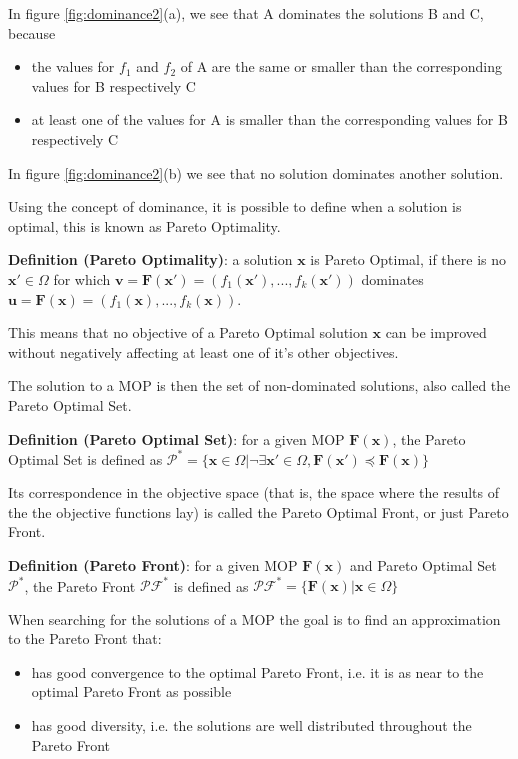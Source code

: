In figure \ref{fig:dominance2}(a), we see that A dominates the solutions B and C, because
\begin{itemize}
  \item the values for $f_1$ and $f_2$ of A are the same or smaller than the corresponding values for B respectively C
  \item at least one of the values for A is smaller than the corresponding values for B respectively C
\end{itemize}
In figure \ref{fig:dominance2}(b) we see that no solution dominates another solution.

Using the concept of dominance, it is possible to define when a solution is optimal, this is known as Pareto Optimality.

\noindent\textbf{Definition (Pareto Optimality)}: a solution $\mathbf{x}$ is Pareto Optimal, if there is no $\mathbf{x'} \in \Omega$ for which $\mathbf{v} = \mathbf{F}(\mathbf{x'}) = (f_1(\mathbf{x'}),...,f_k(\mathbf{x'}))$ dominates $\mathbf{u} = \mathbf{F}(\mathbf{x}) = (f_1(\mathbf{x}),...,f_k(\mathbf{x}))$.

This means that no objective of a Pareto Optimal solution $\mathbf{x}$ can be improved without negatively affecting at least one of it's other objectives.

The solution to a MOP is then the set of non-dominated solutions, also called the Pareto Optimal Set.

\noindent\textbf{Definition (Pareto Optimal Set)}: for a given MOP $\mathbf{F}(\mathbf{x})$, the Pareto Optimal Set is defined as $\mathcal{P}^* = \{\mathbf{x} \in \Omega | \neg \exists \mathbf{x'} \in \Omega, \mathbf{F}(\mathbf{x'}) \preceq \mathbf{F}(\mathbf{x}) \}$

Its correspondence in the objective space (that is, the space where the results of the the objective functions lay) is called the Pareto Optimal Front, or just Pareto Front.

\noindent\textbf{Definition (Pareto Front)}: for a given MOP $\mathbf{F}(\mathbf{x})$ and Pareto Optimal Set $\mathcal{P}^*$, the Pareto Front $\mathcal{PF}^*$ is defined as $\mathcal{PF}^* = \{\mathbf{F}(\mathbf{x}) | \mathbf{x} \in \Omega \}$

When searching for the solutions of a MOP the goal is to find an approximation to the Pareto Front that:
\begin{itemize}
  \item has good convergence to the optimal Pareto Front, i.e. it is as near to the optimal Pareto Front as possible
  \item has good diversity, i.e. the solutions are well distributed throughout the Pareto Front
\end{itemize}

